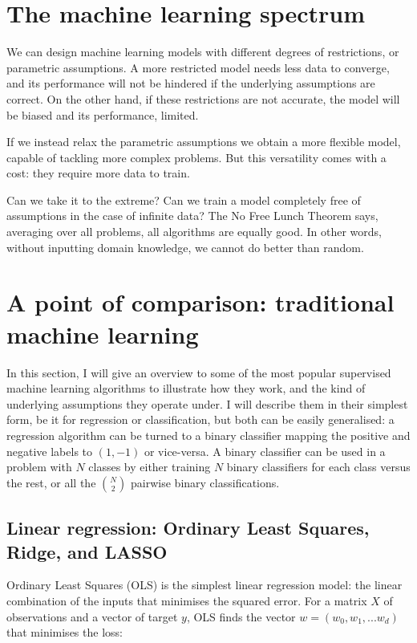 \section{The machine learning spectrum}
We can design machine learning models with different degrees of restrictions, or parametric assumptions.
A more restricted model needs less data to converge, and its performance will not be hindered if the underlying assumptions are correct.
On the other hand, if these restrictions are not accurate, the model will be biased and its performance, limited.

If we instead relax the parametric assumptions we obtain a more flexible model, capable of tackling more complex problems.
But this versatility comes with a cost: they require more data to train.

\begin{center}
\end{center}


Can we take it to the extreme?
Can we train a model completely free  of assumptions in the case of infinite data? The No Free Lunch Theorem \citep{no_free_lunch} says, averaging over all problems, all algorithms are equally good.
In other words, without inputting domain knowledge, we cannot do better than random.

\section[Traditional machine learning]{A point of comparison: traditional machine learning}
In this section, I will give an overview to some of the most popular supervised machine learning algorithms to illustrate how they work, and the kind of underlying assumptions they operate under.
I will describe them in their simplest form, be it for regression or classification, but both can be easily generalised: a regression algorithm can be turned to a binary classifier mapping the positive and negative labels to $(1, -1)$ or vice-versa.
A binary classifier can be used in a problem with $N$ classes by either training $N$ binary classifiers for each class versus the rest, or all the $\binom{N}{2}$ pairwise binary classifications.

\subsection[Linear regression]{Linear regression: Ordinary Least Squares, Ridge, and LASSO}\label{sec:linear}
Ordinary Least Squares (OLS) is the simplest linear regression model: the linear combination of the inputs that minimises the squared error.
For a matrix $X$ of observations and a vector of target $y$, OLS finds the vector $w = (w_0, w_1, ... w_d)$ that minimises the loss:


